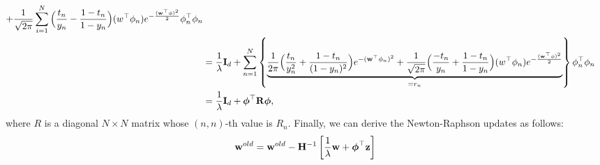 \documentclass[12pt, fullpage,letterpaper]{article}
\begin{document}
\begin{enumerate}
{\begin{align*}
	+ \frac{1}{\sqrt{2\pi}}\sum_{i=1}^N \Big(\frac{t_n}{y_n} - \frac{1-t_n}{1-y_n} \Big)(w^\top\phi_n)e^{-\frac{({\bf w}^\top\phi)^2}{2}} \phi_n^\top\phi_n
	\\
	& = \frac{1}{\lambda}{\bf I}_{d} + \sum_{n=1}^N\left\{\underbrace{\frac{1}{2\pi} \Big(\frac{t_n}{y_n^2} + \frac{1-t_n}{(1-y_n)^2} \Big)e^{-({\bf w}^\top\phi_n)^2}
	+ \frac{1}{\sqrt{2\pi}} \Big(\frac{-t_n}{y_n} + \frac{1-t_n}{1-y_n} \Big)(w^\top\phi_n)e^{-\frac{({\bf w}^\top\phi)^2}{2}}}_{=r_n}\right\} \phi_n^\top\phi_n
	\\
	& = \frac{1}{\lambda}{\bf I}_{d} + \boldsymbol{\phi}^\top{\bf R}\boldsymbol{\phi},
	\end{align*}
	where $R$ is a diagonal $N\times N$ matrix whose $(n,n)$-th value is $R_n$.
	Finally, we can derive the Newton-Raphson updates as follows:
	\begin{align*}
	{\bf w}^{old} = {\bf w}^{old} - {\bf H}^{-1}\left[\frac{1}{\lambda} {\bf w} +   \boldsymbol{\phi}^\top{\bf z}\right]
	\end{align*} 
	}
   

\end{enumerate}
\end{document}
